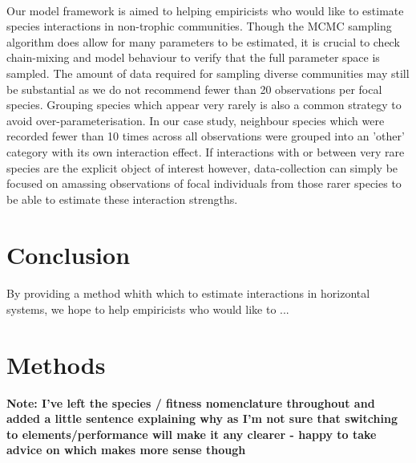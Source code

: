 \documentclass[a4,12pt]{article}
\begin{document}
        \paragraph{}
        Our model framework is aimed to helping empiricists who would like to estimate species interactions in non-trophic communities. Though the MCMC sampling algorithm does allow for many parameters to be estimated, it is crucial to check chain-mixing and model behaviour to verify that the full parameter space is sampled. The amount of data required for sampling diverse communities may still be substantial as we do not recommend fewer than 20 observations per focal species. Grouping species which appear very rarely is also a common strategy to avoid over-parameterisation. In our case study, neighbour species which were recorded fewer than 10 times across all observations were grouped into an 'other' category with its own interaction effect. If interactions with or between very rare species are the explicit object of interest however, data-collection can simply be focused on amassing observations of focal individuals from those rarer species to be able to estimate these interaction strengths.   

\section{Conclusion}

    \paragraph{} 
     By providing a method whith which to estimate interactions in horizontal systems, we hope to help empiricists who would like to ...


    
\section{Methods}

\textbf{Note: I've left the species / fitness nomenclature throughout and added a little sentence explaining why as I'm not sure that switching to elements/performance will make it any clearer - happy to take advice on which makes more sense though}
    
\end{document}
